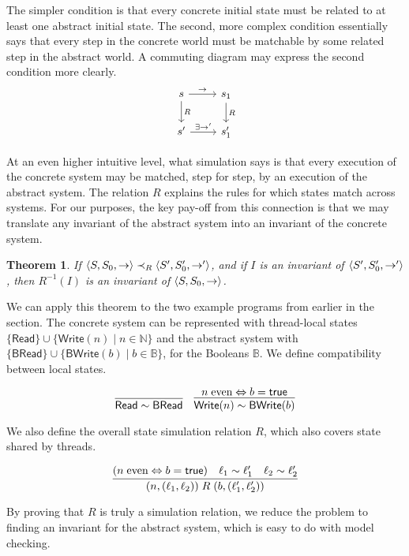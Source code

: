 \documentclass{amsbook}
\newtheorem{theorem}{Theorem}[chapter]
\theoremstyle{definition}
\theoremstyle{remark}
\numberwithin{section}{chapter}
\numberwithin{equation}{chapter}
\begin{document}
The simpler condition is that every concrete initial state must be related to at least one abstract initial state.
The second, more complex condition essentially says that every step in the concrete world must be matchable by some related step in the abstract world.
A commuting diagram may express the second condition more clearly.
\[
\begin{tikzcd}
s \arrow{r}{\to} \arrow{d}{R} & s_1 \arrow{d}{R} \\
s' \arrow{r}{\exists \to'} & s'_1
\end{tikzcd}
\]

At an even higher intuitive level, what simulation says is that every execution of the concrete system may be matched, step for step, by an execution of the abstract system.
The relation $R$ explains the rules for which states match across systems.
For our purposes, the key pay-off from this connection is that we may translate any invariant of the abstract system into an invariant of the concrete system.

\newcommand{\abstraction}[0]{}

\begin{theorem}\label{abstract_simulation}
  \abstraction
  If ${\left \langle S, S_0, \to \right \rangle} \prec_R {\left \langle S', S'_0, \to' \right \rangle}$, and if $I$ is an invariant of ${\left \langle S', S'_0, \to' \right \rangle}$, then $R^{-1}(I)$ is an invariant of ${\left \langle S, S_0, \to \right \rangle}$.
\end{theorem}

We can apply this theorem to the two example programs from earlier in the section.
The concrete system can be represented with thread-local states $\{\mathsf{Read}\} \cup \{\mathsf{Write}(n) \mid n \in \mathbb N\}$ and the abstract system with $\{\mathsf{BRead}\} \cup \{\mathsf{BWrite}(b) \mid b \in \mathbb B\}$, for the Booleans $\mathbb B$.
We define compatibility between local states.

$$\infer{\mathsf{Read} \sim \mathsf{BRead}}{}
\quad \infer{\mathsf{Write}(n) \sim \mathsf{BWrite}(b)}{
  n \; \textrm{even} \Leftrightarrow b = \mathsf{true}
}$$

We also define the overall state simulation relation $R$, which also covers state shared by threads.

$$\infer{(n, (\ell_1, \ell_2)) \; R \; (b, (\ell'_1, \ell'_2))}{
  (n \; \textrm{even} \Leftrightarrow b = \mathsf{true})
  & \ell_1 \sim \ell'_1
  & \ell_2 \sim \ell'_2
}$$

By proving that $R$ is truly a simulation relation, we reduce the problem to finding an invariant for the abstract system, which is easy to do with model checking.
\end{document}
